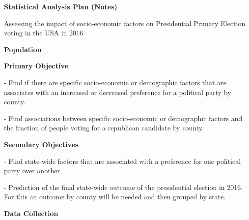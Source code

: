 \documentclass[
12pt, 
english, 
oneside,
doublespacing, %
nolistspacing, %
headsepline, %
]{../Thesis} %
\begin{document}
\frontmatter

\pagestyle{plain}


\mainmatter

{\bfseries\noindent\huge{Statistical Analysis Plan (Notes)}}

{\noindent\Large{Assessing the impact of socio-economic factors on Presidential Primary Election voting in the USA in 2016}} %


\vspace{3ex}
{\bfseries\noindent\large{Population}}



\vspace{3ex}
{\bfseries\noindent\large{Primary Objective}}

- Find if there are specific socio-economic or demographic factors that are associates with an increased or decreased preference for a political party by county.

- Find associations between specific socio-economic or demographic factors and the fraction of people voting for a republican candidate by county.


\vspace{3ex}
{\bfseries\noindent\large{Secondary Objectives}}

- Find state-wide factors that are associated with a preference for one political party over another.

- Prediction of the final state-wide outcome of the presidential election in 2016. For this an outcome by county will be needed and then grouped by state.


\vspace{3ex}
{\bfseries\noindent\large{Data Collection}}
\end{document}
